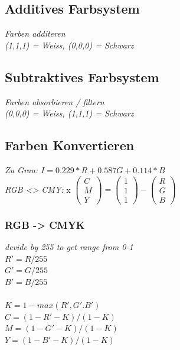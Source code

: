 \subsection{Additives Farbsystem}

\textit{Farben additeren} \\
\textit{(1,1,1) = Weiss, (0,0,0) = Schwarz}

\subsection{Subtraktives Farbsystem}

\textit{Farben absorbieren / filtern} \\ 
\textit{(0,0,0) = Weiss, (1,1,1) = Schwarz}

\subsection{Farben Konvertieren}

\textit{Zu Grau: $I = 0.229*R+0.587G+0.114*B$} \\

\textit{RGB <> CMY: }x
$\begin{pmatrix} C \\ M \\ Y \end{pmatrix} =
\begin{pmatrix} 1 \\ 1 \\ 1 \end{pmatrix} -
\begin{pmatrix} R \\ G \\ B \end{pmatrix}$ \\

\subsubsection{RGB -> CMYK}
\textit{devide by 255 to get range from 0-1}\\
$R' = R / 255$\\
$G' = G / 255$\\
$B' = B / 255$\\
\\
$K = 1-max(R',G'.B')$\\
$C = (1-R'-K) / (1-K)$\\
$M = (1-G'-K) / (1-K)$\\
$Y = (1-B'-K) / (1-K)$\\

